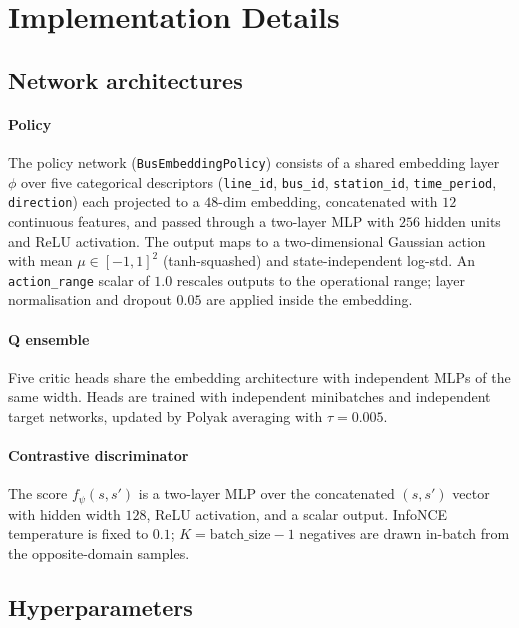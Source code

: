 \section{Implementation Details}
\label{app:impl}

\subsection{Network architectures}

\paragraph{Policy}
The policy network (\texttt{BusEmbeddingPolicy}) consists of a shared embedding layer $\phi$ over five categorical descriptors (\texttt{line\_id}, \texttt{bus\_id}, \texttt{station\_id}, \texttt{time\_period}, \texttt{direction}) each projected to a $48$-dim embedding, concatenated with $12$ continuous features, and passed through a two-layer MLP with $256$ hidden units and ReLU activation.
The output maps to a two-dimensional Gaussian action with mean $\mu \in [-1, 1]^2$ (tanh-squashed) and state-independent log-std.
An \texttt{action\_range} scalar of $1.0$ rescales outputs to the operational range; layer normalisation and dropout $0.05$ are applied inside the embedding.

\paragraph{Q ensemble}
Five critic heads share the embedding architecture with independent MLPs of the same width.
Heads are trained with independent minibatches and independent target networks, updated by Polyak averaging with $\tau = 0.005$.

\paragraph{Contrastive discriminator}
The score $f_\psi(s, s')$ is a two-layer MLP over the concatenated $(s, s')$ vector with hidden width $128$, ReLU activation, and a scalar output.
InfoNCE temperature is fixed to $0.1$; $K = \text{batch\_size} - 1$ negatives are drawn in-batch from the opposite-domain samples.

\subsection{Hyperparameters}

